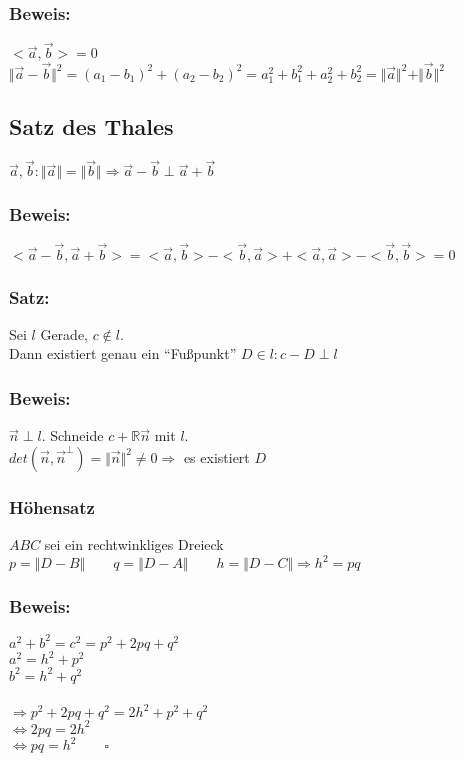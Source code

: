 \subsubsection{Beweis:}
$<\vec{a},\vec{b}>=0 $\\
$\Vert \vec{a} - \vec{b} \Vert^{2} = (a_{1}-b_{1})^{2} + (a_{2} - b_{2})^{2} = a_{1}^{2}+b_{1}^{2}+a_{2}^{2}+b_{2}^{2} = \Vert \vec{a} \Vert^{2} + \Vert \vec{b} \Vert^{2}$
%
%
%
\subsection{Satz des Thales}
$\vec{a},\vec{b}: \Vert \vec{a} \Vert =\Vert \vec{b} \Vert \Rightarrow \vec{a} - \vec{b} \perp  \vec{a} + \vec{b}$
%
%
%
\subsubsection{Beweis:}
$<\vec{a}-\vec{b},\vec{a} + \vec{b}> = <\vec{a},\vec{b}>-<\vec{b},\vec{a}>+<\vec{a},\vec{a}>-<\vec{b},\vec{b}>=0$
%
%
%
\subsubsection{Satz:}
Sei $l$ Gerade, $c \notin l$. \\
Dann existiert genau ein "`Fußpunkt"' $D \in l: c-D\perp l$
%
%
%
\subsubsection{Beweis:}
$\vec{n} \perp l$. Schneide $c+ \mathbb{R}\vec{n}$  mit $l$. \\
$det(\vec{n},\vec{n}^{\perp})=\Vert \vec{n}\Vert^{2} \neq 0 \Rightarrow$ es existiert $D$ 
%
%
%
\subsubsection{Höhensatz}
$ABC$ sei ein rechtwinkliges Dreieck
$p=\Vert D-B \Vert \qquad q=\Vert D-A\Vert \qquad h=\Vert D-C\Vert \Rightarrow h^{2}=pq$
%
%
%
\subsubsection{Beweis:}
$a^{2} + b^{2} = c^{2} = p^{2} + 2pq + q^{2}$\\
$a^{2}=h^{2}+p^{2}$\\
$b^{2}=h^{2}+q^{2}$\\
\qquad\\
$\Rightarrow p^{2} + 2pq +q^{2} = 2h^{2}+p^{2}+q^{2}$\\
$\Leftrightarrow 2pq = 2h^{2}$\\
$\Leftrightarrow pq=h^{2} \qquad \square$
%
%
%
